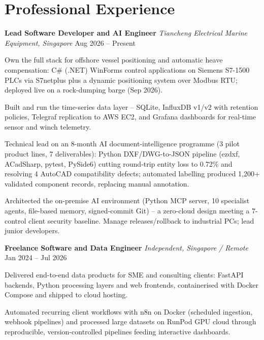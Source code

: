 \documentclass[letterpaper,10pt]{article}
\newcommand{\role}[3]{\textbf{#1} \textbar{} \textit{#2} \hfill #3\\[1pt]}
\begin{document}
\section*{Professional Experience}

\role{Lead Software Developer and AI Engineer}
     {Tiancheng Electrical Marine Equipment, Singapore}{Aug 2026 -- Present}
\begin{tight}
  \item Own the full stack for offshore vessel positioning and automatic heave compensation:
  C\# (.NET) WinForms control applications on Siemens S7-1500 PLCs via S7netplus plus a
  dynamic positioning system over Modbus RTU; deployed live on a rock-dumping barge (Sep 2026).
  \item Built and run the time-series data layer -- SQLite, InfluxDB v1/v2 with retention
  policies, Telegraf replication to AWS EC2, and Grafana dashboards for real-time sensor and
  winch telemetry.
  \item Technical lead on an 8-month AI document-intelligence programme (3 pilot product
  lines, 7 deliverables): Python DXF/DWG-to-JSON pipeline (ezdxf, ACadSharp, pytest, PySide6)
  cutting round-trip entity loss to 0.72\% and resolving 4 AutoCAD compatibility defects;
  automated labelling produced 1,200+ validated component records, replacing manual annotation.
  \item Architected the on-premise AI environment (Python MCP server, 10 specialist agents,
  file-based memory, signed-commit Git) -- a zero-cloud design meeting a 7-control client
  security baseline. Manage releases/rollback to industrial PCs; lead junior developers.
\end{tight}

\vspace{2pt}
\role{Freelance Software and Data Engineer}{Independent, Singapore / Remote}{Jan 2024 -- Jul 2026}
\begin{tight}
  \item Delivered end-to-end data products for SME and consulting clients: FastAPI backends,
  Python processing layers and web frontends, containerised with Docker Compose and shipped
  to cloud hosting.
  \item Automated recurring client workflows with n8n on Docker (scheduled ingestion,
  webhook pipelines) and processed large datasets on RunPod GPU cloud through reproducible,
  version-controlled pipelines feeding interactive dashboards.
\end{tight}
\end{document}
